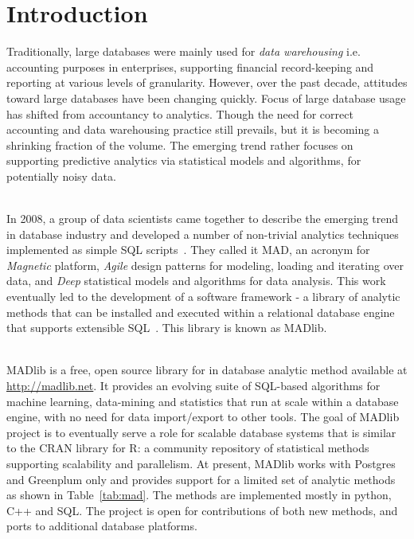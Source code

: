 \section{Introduction}
\label{sect:introduction}
Traditionally, large databases were mainly used for {\itshape data warehousing} i.e. accounting purposes in enterprises, supporting financial record-keeping and reporting at various levels of granularity. However, over the past decade, attitudes toward large databases have been changing quickly. Focus of large database usage has shifted from accountancy to analytics. Though the need for correct accounting and data warehousing practice still prevails, but it is becoming a shrinking fraction of the volume. The emerging trend rather focuses on supporting predictive analytics via statistical models and algorithms, for potentially noisy data.

~~\\
In 2008, a group of data scientists came together to describe the emerging trend in database industry and developed a number of non-trivial analytics techniques implemented as simple SQL scripts~\cite{mad09}. They called it MAD, an acronym for \emph{Magnetic} platform, \emph{Agile} design patterns for modeling, loading and iterating over data, and \emph{Deep} statistical models and algorithms for data analysis. This work eventually led to the development of a software framework - a library of analytic methods that can be installed and executed within a relational database engine that supports extensible SQL~\cite{madlib12}. This library is known as MADlib.

~~\\
MADlib is a free, open source library for in database analytic method available at \url{http://madlib.net}. It provides an evolving suite of SQL-based algorithms for machine learning, data-mining and statistics that run at scale within a database engine, with no need for data import/export to other tools. The goal of MADlib project is to eventually serve a role for scalable database systems that is similar to the CRAN library for R: a community repository of statistical methods supporting scalability and parallelism. At present, MADlib works with Postgres and Greenplum only and provides support for a limited set of analytic methods as shown in Table~\ref{tab:mad}. The methods are implemented mostly in python, C++ and SQL. The project is open for contributions of both new methods, and ports to additional database platforms.

